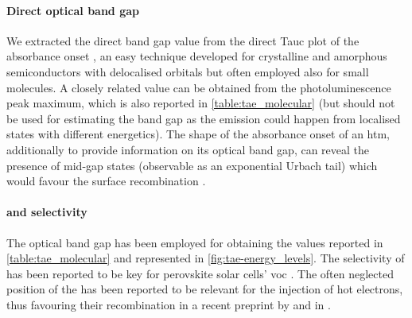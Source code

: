 	\paragraph{Direct optical band gap}
	We extracted the direct band gap value from the direct Tauc plot of the absorbance onset \cite{WikipediaTauc}, an easy technique developed for crystalline and amorphous semiconductors \cite{Stenzel2005} with delocalised orbitals but often employed also for small molecules.
	A closely related value can be obtained from the photoluminescence peak maximum, which is also reported in \cref{table:tae_molecular} (but should not be used for estimating the band gap as the emission could happen from localised states with different energetics).
	The shape of the absorbance onset of an \gls{htm}, additionally to provide information on its optical band gap, can reveal the presence of mid-gap states (observable as an exponential Urbach tail) which would favour the surface recombination \cite{Tvingstedt2017}.

	\paragraph{ and selectivity}
	The optical band gap has been employed for obtaining the  values reported in \cref{table:tae_molecular} and represented in \cref{fig:tae-energy_levels}.
	The selectivity of  has been reported to be key for perovskite solar cells' \gls{voc} \cite{Stolterfoht2018a}.
	The often neglected position of the   has been reported to be relevant for the injection of hot electrons, thus favouring their recombination in a recent preprint by  and in .

